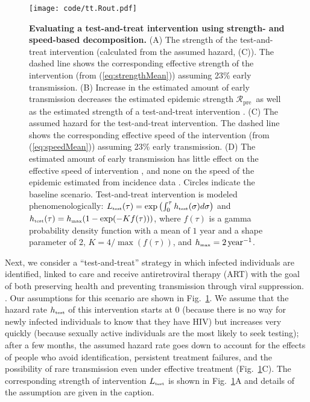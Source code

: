 \documentclass[12pt]{article}
\newcommand{\RR}{\ensuremath{{\mathcal R}}}
\newcommand{\Rx}[1]{\ensuremath{\RR_{\mathrm{#1}}}} %
\newcommand{\Rpre}{\Rx{pre}} %
\newcommand{\Rhat}{\ensuremath{{\hat\RR}}}
\newcommand{\rr}{\ensuremath{{r}}}
\newcommand{\rx}[1]{\ensuremath{\rr_{\mathrm{#1}}}} %
\newcommand{\rpre}{\rx{pre}} %
\newcommand{\rhat}{\ensuremath{{\hat\rr}}}
\newcommand{\tsub}[2]{#1_{{\textrm{\tiny #2}}}}
\newcommand{\figref}[1]{Fig.~\ref{fig:#1}}
\newcommand{\figlab}[1]{\label{fig:#1}}
\renewcommand{\eqref}[1]{(\ref{eq:#1})} %
\providecommand{\DIFaddtex}[1]{{\protect\color{blue}\uwave{#1}}} %
\providecommand{\DIFdeltex}[1]{{\protect\color{red}\sout{#1}}}                      %
\providecommand{\DIFaddFL}[1]{\DIFadd{#1}} %
\providecommand{\DIFdelFL}[1]{\DIFdel{#1}} %
\providecommand{\DIFaddbeginFL}{} %
\providecommand{\DIFaddendFL}{} %
\providecommand{\DIFdelbeginFL}{} %
\providecommand{\DIFdelendFL}{} %
\providecommand{\DIFadd}[1]{\texorpdfstring{\DIFaddtex{#1}}{#1}} %
\providecommand{\DIFdel}[1]{\texorpdfstring{\DIFdeltex{#1}}{}} %
\newcommand{\DIFscaledelfig}{0.5}
\newlength{\DIFdelgraphicswidth} %
\newlength{\DIFdelgraphicsheight} %
\newcommand{\DIFaddincludegraphics}[2][]{{\color{blue}\fbox{\DIFOincludegraphics[#1]{#2}}}} %
\newcommand{\DIFdelincludegraphics}[2][]{%
\sbox{\DIFdelgraphicsbox}{\DIFOincludegraphics[#1]{#2}}%
\settoboxwidth{\DIFdelgraphicswidth}{\DIFdelgraphicsbox} %
\settoboxtotalheight{\DIFdelgraphicsheight}{\DIFdelgraphicsbox} %
\scalebox{\DIFscaledelfig}{%
\parbox[b]{\DIFdelgraphicswidth}{\usebox{\DIFdelgraphicsbox}\\[-\baselineskip] \rule{\DIFdelgraphicswidth}{0em}}\llap{\resizebox{\DIFdelgraphicswidth}{\DIFdelgraphicsheight}{%
\setlength{\unitlength}{\DIFdelgraphicswidth}%
\begin{picture}(1,1)%
\thicklines\linethickness{2pt} %
{\color[rgb]{1,0,0}\put(0,0){\framebox(1,1){}}}%
{\color[rgb]{1,0,0}\put(0,0){\line( 1,1){1}}}%
{\color[rgb]{1,0,0}\put(0,1){\line(1,-1){1}}}%
\end{picture}%
}\hspace*{3pt}}} %
} %
\DeclareRobustCommand{\DIFaddbeginFL}{\DIFOaddbeginFL \let\includegraphics\DIFaddincludegraphics} %
\DeclareRobustCommand{\DIFaddendFL}{\DIFOaddendFL \let\includegraphics\DIFOincludegraphics} %
\DeclareRobustCommand{\DIFdelbeginFL}{\DIFOdelbeginFL \let\includegraphics\DIFdelincludegraphics} %
\DeclareRobustCommand{\DIFdelendFL}{\DIFOaddendFL \let\includegraphics\DIFOincludegraphics} %
\begin{document}
\begin{figure}[!t]
\texttt{[image: code/tt.Rout.pdf]}
\caption{
\textbf{Evaluating a test-and-treat intervention using strength- and speed-based decomposition.}
(A) The strength of the test-and-treat intervention (calculated from the assumed hazard, (C)). The dashed line shows the corresponding effective strength of the intervention (from \eqref{strengthMean}) assuming 23\% early transmission.
(B) Increase in the estimated amount of early transmission decreases the estimated epidemic strength \DIFdelbeginFL %
\DIFdelendFL \DIFaddbeginFL \Rpre\DIFaddendFL \ as well as the estimated strength \DIFaddbeginFL \DIFaddFL{$\theta$ }\DIFaddendFL of a test-and-treat intervention\DIFdelbeginFL %
\DIFdelendFL .
(C) The assumed hazard for the test-and-treat intervention. 
The dashed line shows the corresponding effective speed of the intervention (from \eqref{speedMean}) assuming 23\% early transmission.
(D) The estimated amount of early transmission has little effect on the effective speed of intervention \DIFdelbeginFL %
\DIFdelendFL \DIFaddbeginFL \DIFaddFL{$\phi$}\DIFaddendFL , and none on the \DIFaddbeginFL \DIFaddFL{pre-intervention }\DIFaddendFL speed \DIFaddbeginFL \DIFaddFL{$\rpre$ }\DIFaddendFL of the epidemic estimated from incidence data\DIFdelbeginFL %
\DIFdelendFL .
Circles indicate the baseline scenario.
Test-and-treat intervention is modeled phenomenologically: $\tsub{L}{test}(\tau) = \exp\left(\int_0^\tau \tsub{h}{test}(\sigma) d\sigma \right)$ and \DIFdelbeginFL \DIFdelFL{$\tsub{h}{test}(\tau) = \tsub{h}{max} (1 - \exp(- K f(\tau)))$}\DIFdelendFL \DIFaddbeginFL \DIFaddFL{$\tsub{h}{test}(\tau) = \tsub{h}{max} (1 - \exp(- k f(\tau)))$}\DIFaddendFL , where $f(\tau)$ is a gamma probability density function with a mean of $1$ year and a shape parameter of 2, \DIFdelbeginFL \DIFdelFL{$K = 4/\max(f(\tau))$}\DIFdelendFL \DIFaddbeginFL \DIFaddFL{$k = 4/\max(f(\tau))$}\DIFaddendFL , and $\tsub{h}{max} = 2\,\mathrm{year}^{-1}$.
}
\figlab{test}
\end{figure}

Next, we consider a ``test-and-treat'' strategy in which infected individuals are identified, linked to care and receive antiretroviral therapy (ART) with the goal of both preserving health and preventing transmission through viral suppression. \citep{garnett2009treating, granich2009universal, nah2017test}.
Our assumptions for this scenario are shown in \figref{test}.
We assume that the hazard rate $\tsub{h}{test}$ of this intervention starts at 0 (because there is no way for newly infected individuals to know that they have HIV) but increases very quickly (because sexually active individuals are the most likely to seek testing); 
after a few months, the assumed hazard rate goes down to account for the effects of people who avoid identification, persistent treatment failures, and the possibility of rare transmission even under effective treatment (\figref{test}C). The corresponding strength of intervention $\tsub{L}{test}$ is shown in \figref{test}A and details of the assumption are given in the caption.
\end{document}
